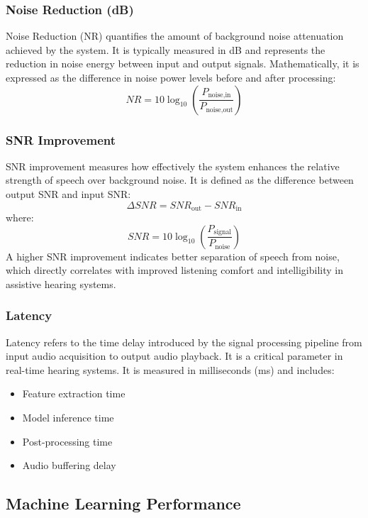 \subsubsection{Noise Reduction (dB)} 
Noise Reduction (NR) quantifies the amount of background noise attenuation achieved by the system. It is typically measured in dB and represents the reduction in noise energy between input and output signals.
Mathematically, it is expressed as the difference in noise power levels before and after processing:
\begin{equation}
NR = 10 \log_{10}\left(\frac{P_{\text{noise,in}}}{P_{\text{noise,out}}}\right)
\end{equation} 

\subsubsection{SNR Improvement} 
SNR improvement measures how effectively the system enhances the relative strength of speech over background noise. It is defined as the difference between output SNR and input SNR:
\begin{equation}
\Delta SNR = SNR_{\text{out}} - SNR_{\text{in}}
\end{equation}
where:
\begin{equation}
SNR = 10 \log_{10}\left(\frac{P_{\text{signal}}}{P_{\text{noise}}}\right)
\end{equation}
A higher SNR improvement indicates better separation of speech from noise, which directly correlates with improved listening comfort and intelligibility in assistive hearing systems.\\
\subsubsection{Latency} 
Latency refers to the time delay introduced by the signal processing pipeline from input audio acquisition to output audio playback. It is a critical parameter in real-time hearing systems.
It is measured in milliseconds (ms) and includes:
\begin{itemize}
    \item Feature extraction time
    \item Model inference time
    \item Post-processing time
    \item Audio buffering delay
\end{itemize}
\subsection{Machine Learning Performance}
